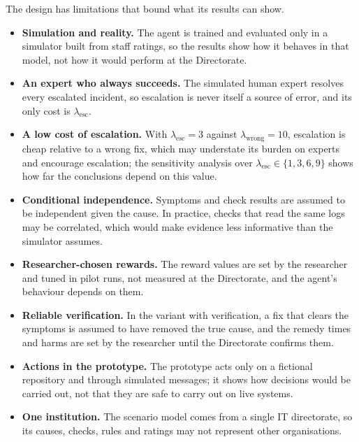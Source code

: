 The design has limitations that bound what its results can show.
\begin{itemize}[nosep]
\item \textbf{Simulation and reality.} The agent is trained and evaluated only in a simulator built from staff ratings, so the results show how it behaves in that model, not how it would perform at the Directorate.
\item \textbf{An expert who always succeeds.} The simulated human expert resolves every escalated incident, so escalation is never itself a source of error, and its only cost is $\lambda_{\text{esc}}$.
\item \textbf{A low cost of escalation.} With $\lambda_{\text{esc}} = 3$ against $\lambda_{\text{wrong}} = 10$, escalation is cheap relative to a wrong fix, which may understate its burden on experts and encourage escalation; the sensitivity analysis over $\lambda_{\text{esc}} \in \{1, 3, 6, 9\}$ shows how far the conclusions depend on this value.
\item \textbf{Conditional independence.} Symptoms and check results are assumed to be independent given the cause. In practice, checks that read the same logs may be correlated, which would make evidence less informative than the simulator assumes.
\item \textbf{Researcher-chosen rewards.} The reward values are set by the researcher and tuned in pilot runs, not measured at the Directorate, and the agent's behaviour depends on them.
\item \textbf{Reliable verification.} In the variant with verification, a fix that clears the symptoms is assumed to have removed the true cause, and the remedy times and harms are set by the researcher until the Directorate confirms them.
\item \textbf{Actions in the prototype.} The prototype acts only on a fictional repository and through simulated messages; it shows how decisions would be carried out, not that they are safe to carry out on live systems.
\item \textbf{One institution.} The scenario model comes from a single IT directorate, so its causes, checks, rules and ratings may not represent other organisations.
\end{itemize}
